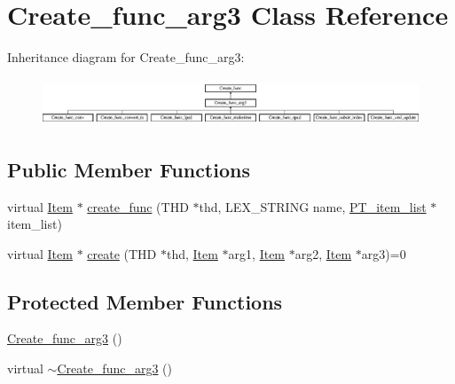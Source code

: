 \hypertarget{classCreate__func__arg3}{}\section{Create\+\_\+func\+\_\+arg3 Class Reference}
\label{classCreate__func__arg3}
Inheritance diagram for Create\+\_\+func\+\_\+arg3\+:\begin{figure}[H]
\begin{center}
\leavevmode
\includegraphics[height=1.428571cm]{classCreate__func__arg3}
\end{center}
\end{figure}
\subsection*{Public Member Functions}
\begin{DoxyCompactItemize}
\item 
virtual \mbox{\hyperlink{classItem}{Item}} $\ast$ \mbox{\hyperlink{classCreate__func__arg3_a0c0451ba2b1028246891f8519e6b9616}{create\+\_\+func}} (T\+HD $\ast$thd, L\+E\+X\+\_\+\+S\+T\+R\+I\+NG name, \mbox{\hyperlink{classPT__item__list}{P\+T\+\_\+item\+\_\+list}} $\ast$item\+\_\+list)
\item 
virtual \mbox{\hyperlink{classItem}{Item}} $\ast$ \mbox{\hyperlink{classCreate__func__arg3_aba0a6029bc80a4dd30ce13a9297f7225}{create}} (T\+HD $\ast$thd, \mbox{\hyperlink{classItem}{Item}} $\ast$arg1, \mbox{\hyperlink{classItem}{Item}} $\ast$arg2, \mbox{\hyperlink{classItem}{Item}} $\ast$arg3)=0
\end{DoxyCompactItemize}
\subsection*{Protected Member Functions}
\begin{DoxyCompactItemize}
\item 
\mbox{\hyperlink{classCreate__func__arg3_a31b4a25cbb06784c4c4bfa6ae8e77b1b}{Create\+\_\+func\+\_\+arg3}} ()
\item 
virtual \mbox{\hyperlink{classCreate__func__arg3_a3ad0a2429248457a70368f50d36ff456}{$\sim$\+Create\+\_\+func\+\_\+arg3}} ()
\end{DoxyCompactItemize}



